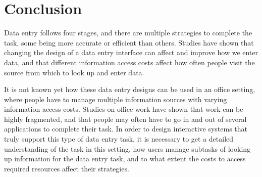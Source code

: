 \section{Conclusion}
Data entry follows four stages, and there are multiple strategies to complete the task, some being more accurate or efficient than others. Studies have shown that changing the design of a data entry interface can affect and improve how we enter data, and that different information access costs affect how often people visit the source from which to look up and enter data.

It is not known yet how these data entry designs can be used in an office setting, where people have to manage multiple information sources with varying information access costs. Studies on office work have shown that work can be highly fragmented, and that people may often have to go in and out of several applications to complete their task. 
In order to design interactive systems that truly support this type of data entry task, it is necessary to get a detailed understanding of the task in this setting, how users manage subtasks of looking up information for the data entry task, and to what extent the costs to access required resources affect their strategies.